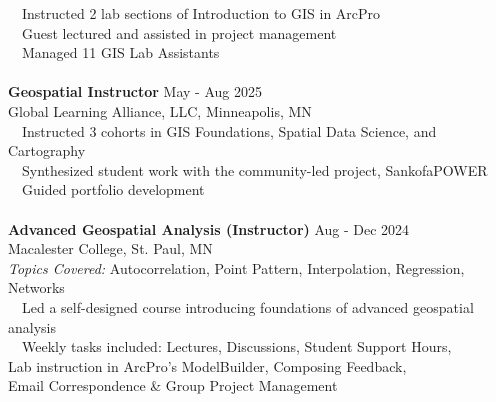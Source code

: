 \documentclass[letterpaper,12pt]{article}
\numberwithin{equation}{section}
\begin{document}
\hspace*{1.2in} \textbullet ~~Instructed 2 lab sections of Introduction to GIS in ArcPro\\
\hspace*{1.2in} \textbullet ~~Guest lectured and assisted in project management\\
\hspace*{1.2in} \textbullet ~~Managed 11 GIS Lab Assistants\\
\\
\hspace*{1.16in}\textbf{Geospatial Instructor} \hspace*{3.4in} May - Aug 2025 \\ \hspace*{1.16in} Global Learning Alliance, LLC, Minneapolis, MN \\ 
\hspace*{1.2in} \textbullet ~~Instructed 3 cohorts in GIS Foundations, Spatial Data Science, and Cartography\\
\hspace*{1.2in} \textbullet ~~Synthesized student work with the community-led project, SankofaPOWER\\
\hspace*{1.2in} \textbullet ~~Guided portfolio development\\
\\
\hspace*{1.16in}\textbf{Advanced Geospatial Analysis (Instructor)} \hspace*{1.6in} Aug - Dec 2024 \\ \hspace*{1.16in} Macalester College, St. Paul, MN \\ 
\hspace*{1.16in} \textit{Topics Covered:} Autocorrelation, Point Pattern, Interpolation, Regression, Networks \\
\hspace*{1.2in} \textbullet ~~Led a self-designed course introducing foundations of advanced geospatial analysis\\
\hspace*{1.2in} \textbullet ~~Weekly tasks included: Lectures, Discussions, Student Support Hours,\\
\hspace*{1.6in}Lab instruction in ArcPro's ModelBuilder, Composing Feedback, \\
\hspace*{1.6in}Email Correspondence \& Group Project Management\\
\end{document}
